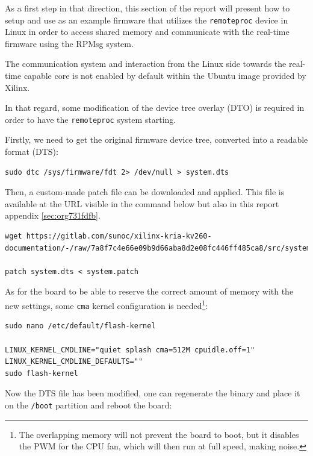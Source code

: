 \documentclass[10pt]{article}
\begin{document}
As a first step in that direction, this section of the report
will present how to setup and use as an example firmware that utilizes the
\texttt{remoteproc} device in Linux in order to access shared memory
and communicate with the real-time firmware using the RPMsg system.

The communication system and interaction from the Linux side towards the real-time capable core
is not enabled by default within the Ubuntu image provided by Xilinx.

In that regard, some modification of the device tree overlay (DTO) is required in order to have
the \texttt{remoteproc} system starting.

Firstly, we need to get the original firmware device tree, converted
into a readable format (DTS):

\begin{verbatim}
sudo dtc /sys/firmware/fdt 2> /dev/null > system.dts
\end{verbatim}

Then, a custom-made patch file can be downloaded and applied.
This file is available at the URL visible in the command below
but also in this report appendix \ref{sec:org731fdfb}.

\begin{verbatim}
wget https://gitlab.com/sunoc/xilinx-kria-kv260-documentation/-/raw/7a8f7c4e66e09b9d66aba8d2e08fc446ff485ca8/src/system.patch

patch system.dts < system.patch
\end{verbatim}


As for the board to be able to reserve the correct amount of memory with the new settings, some
\texttt{cma} kernel configuration is needed\footnote{The overlapping memory will not prevent the board to boot,
but it disables the PWM for the CPU fan, which will then run at full speed, making noise.}:

\begin{verbatim}
sudo nano /etc/default/flash-kernel

LINUX_KERNEL_CMDLINE="quiet splash cma=512M cpuidle.off=1"
LINUX_KERNEL_CMDLINE_DEFAULTS=""
sudo flash-kernel
\end{verbatim}

Now the DTS file has been modified, one can regenerate the binary and place it on the \texttt{/boot} partition
and reboot the board:
\end{document}
